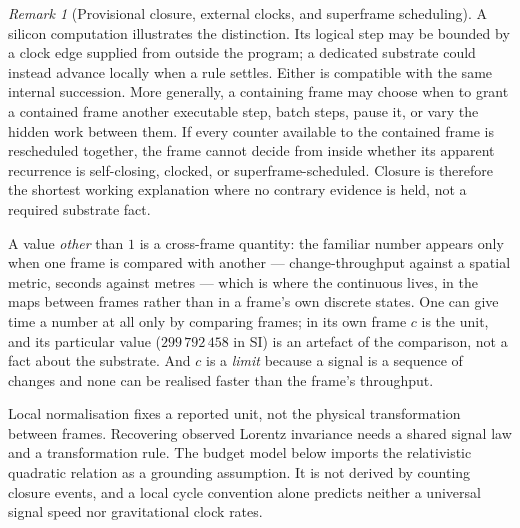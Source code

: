 \documentclass[11pt,a4paper]{article}
\theoremstyle{remark}\newtheorem{remark}[definition]{Remark}
\begin{document}
\begin{remark}[Provisional closure, external clocks, and superframe scheduling]\label{rem:clock-provisional}
A silicon computation illustrates the distinction. Its logical step may be bounded by a clock edge
supplied from outside the program; a dedicated substrate could instead advance locally when a rule
settles. Either is compatible with the same internal succession. More generally, a containing frame
may choose when to grant a contained frame another executable step, batch steps, pause it, or vary the
hidden work between them. If every counter available to the contained frame is rescheduled together,
the frame cannot decide from inside whether its apparent recurrence is self-closing, clocked, or
superframe-scheduled. Closure is therefore the shortest working explanation where no contrary evidence
is held, not a required substrate fact.
\end{remark}
A value \emph{other} than $1$ is a cross-frame quantity: the familiar number
appears only when one frame is compared with another --- change-throughput
against a spatial metric, seconds against metres --- which is where the
continuous lives, in the maps between frames rather than in a frame's own
discrete states. One can give time a number at all only by comparing frames; in
its own frame $c$ is the unit, and its particular value ($299\,792\,458$ in
SI) is an artefact of the comparison, not a fact about the substrate. And $c$ is
a \emph{limit} because a signal is a sequence of changes and none can be realised
faster than the frame's throughput.

Local normalisation fixes a reported unit, not the physical transformation
between frames. Recovering observed Lorentz invariance needs a shared signal
law and a transformation rule. The budget model below imports the relativistic
quadratic relation as a grounding assumption. It is not derived by counting
closure events, and a local cycle convention alone predicts neither a universal
signal speed nor gravitational clock rates.
\end{document}
